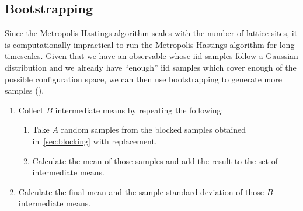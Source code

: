 		
		
	
	\subsection{Bootstrapping}
		Since the Metropolis-Hastings algorithm scales with the number of lattice sites, it is computationally impractical to run the Metropolis-Hastings algorithm for long timescales. Given that we have an observable whose iid samples follow a Gaussian distribution and we already have \enquote{enough} iid samples which cover enough of the possible configuration space, we can then use bootstrapping to generate more samples (\citet{bootstrap}).
		\begin{enumerate}
			\item Collect $B$ intermediate means by repeating the following:
			\begin{enumerate}
				\item Take $A$ random samples from the blocked samples obtained in~\cref{sec:blocking} with replacement.
				\item Calculate the mean of those samples and add the result to the set of intermediate means.
			\end{enumerate}
			\item Calculate the final mean and the sample standard deviation of those $B$ intermediate means.
		\end{enumerate}